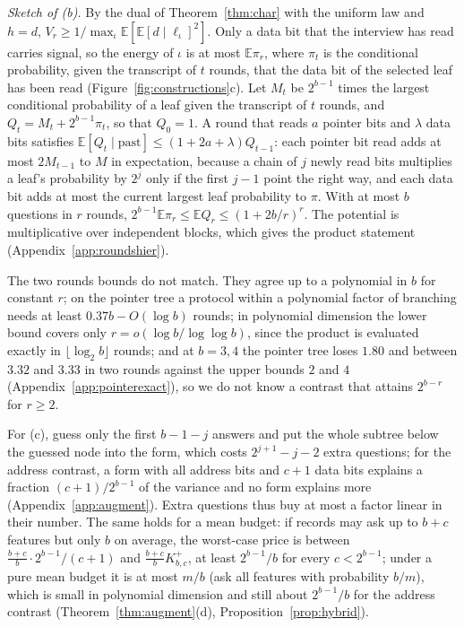 \documentclass{article}
\newcommand{\E}{\mathbb{E}}
\begin{document}
\emph{Sketch of (b).} By the dual of Theorem~\ref{thm:char} with the uniform law and $h=d$, $V_r\ge1/\max_\iota\E[\E[d\mid\ell_\iota]^2]$. Only a data bit that the interview has read carries signal, so the energy of $\iota$ is at most $\E\pi_r$, where $\pi_t$ is the conditional probability, given the transcript of $t$ rounds, that the data bit of the selected leaf has been read (Figure~\ref{fig:constructions}c). Let $M_t$ be $2^{b-1}$ times the largest conditional probability of a leaf given the transcript of $t$ rounds, and $Q_t=M_t+2^{b-1}\pi_t$, so that $Q_0=1$. A round that reads $a$ pointer bits and $\lambda$ data bits satisfies $\E[Q_t\mid\text{past}]\le(1+2a+\lambda)Q_{t-1}$: each pointer bit read adds at most $2M_{t-1}$ to $M$ in expectation, because a chain of $j$ newly read bits multiplies a leaf's probability by $2^j$ only if the first $j-1$ point the right way, and each data bit adds at most the current largest leaf probability to $\pi$. With at most $b$ questions in $r$ rounds, $2^{b-1}\E\pi_r\le\E Q_r\le(1+2b/r)^r$. The potential is multiplicative over independent blocks, which gives the product statement (Appendix~\ref{app:roundshier}).

The two rounds bounds do not match. They agree up to a polynomial in $b$ for constant $r$; on the pointer tree a protocol within a polynomial factor of branching needs at least $0.37b-O(\log b)$ rounds; in polynomial dimension the lower bound covers only $r=o(\log b/\log\log b)$, since the product is evaluated exactly in $\lfloor\log_2b\rfloor$ rounds; and at $b=3,4$ the pointer tree loses $1.80$ and between $3.32$ and $3.33$ in two rounds against the upper bounds $2$ and $4$ (Appendix~\ref{app:pointerexact}), so we do not know a contrast that attains $2^{b-r}$ for $r\ge2$.

For (c), guess only the first $b-1-j$ answers and put the whole subtree below the guessed node into the form, which costs $2^{j+1}-j-2$ extra questions; for the address contrast, a form with all address bits and $c+1$ data bits explains a fraction $(c+1)/2^{b-1}$ of the variance and no form explains more (Appendix~\ref{app:augment}). Extra questions thus buy at most a factor linear in their number. The same holds for a mean budget: if records may ask up to $b+c$ features but only $b$ on average, the worst-case price is between $\frac{b+c}{b}\cdot2^{b-1}/(c+1)$ and $\frac{b+c}{b}K^{+}_{b,c}$, at least $2^{b-1}/b$ for every $c<2^{b-1}$; under a pure mean budget it is at most $m/b$ (ask all features with probability $b/m$), which is small in polynomial dimension and still about $2^{b-1}/b$ for the address contrast (Theorem~\ref{thm:augment}(d), Proposition~\ref{prop:hybrid}).
\end{document}
